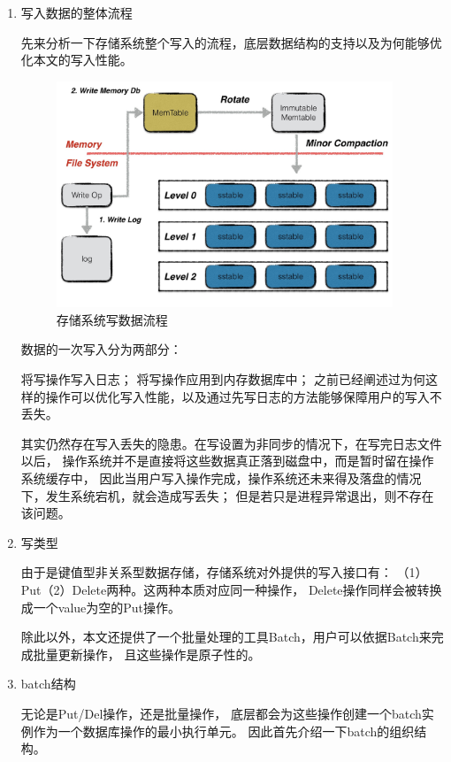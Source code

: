 		\begin{enumerate}
		\item 写入数据的整体流程
			
		先来分析一下存储系统整个写入的流程，底层数据结构的支持以及为何能够优化本文的写入性能。
		
		\begin{figure}[H]
			\centering
			\includegraphics[width=0.95\textwidth]{images/write_op}
			\caption{存储系统写数据流程}
			\label{write_op}
		\end{figure}

		数据的一次写入分为两部分：

		将写操作写入日志；
		将写操作应用到内存数据库中；
		之前已经阐述过为何这样的操作可以优化写入性能，以及通过先写日志的方法能够保障用户的写入不丢失。

		其实仍然存在写入丢失的隐患。在写设置为非同步的情况下，在写完日志文件以后，
		操作系统并不是直接将这些数据真正落到磁盘中，而是暂时留在操作系统缓存中，
		因此当用户写入操作完成，操作系统还未来得及落盘的情况下，发生系统宕机，就会造成写丢失；
		但是若只是进程异常退出，则不存在该问题。

		\item 写类型
		
		由于是键值型非关系型数据存储，存储系统对外提供的写入接口有：
		（1）Put（2）Delete两种。这两种本质对应同一种操作，
		Delete操作同样会被转换成一个value为空的Put操作。
	
		除此以外，本文还提供了一个批量处理的工具Batch，用户可以依据Batch来完成批量更新操作，
		且这些操作是原子性的。

		\item batch结构
		
		无论是Put/Del操作，还是批量操作，
		底层都会为这些操作创建一个batch实例作为一个数据库操作的最小执行单元。
		因此首先介绍一下batch的组织结构。


\end{enumerate}
